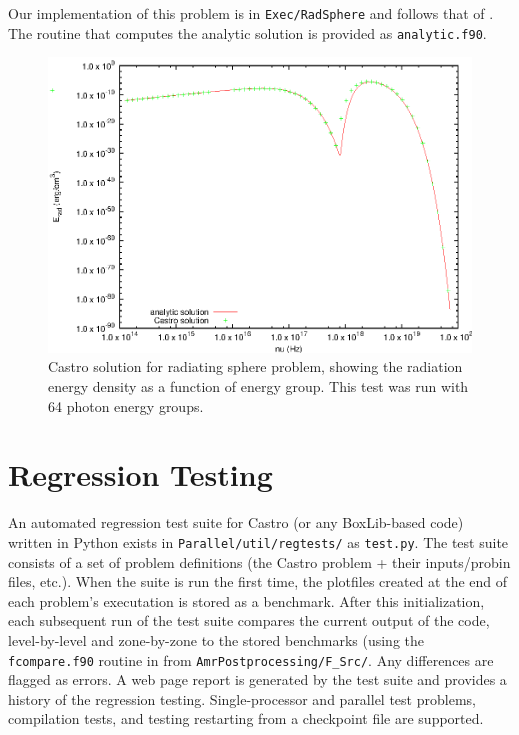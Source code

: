 Our implementation of this problem is in {\tt Exec/RadSphere} and
follows that of \cite{swestymyra:2009}.  The routine that computes
the analytic solution is provided as {\tt analytic.f90}.

\begin{figure}[h]
\centering
\includegraphics[width=5.0in]{CastroVerification/radiating_sphere}
\caption{\label{fig:radsphere} Castro solution for radiating sphere problem,
  showing the radiation energy density as a function of energy group.
  This test was run with 64 photon energy groups.}
\end{figure}


\section{Regression Testing}

An automated regression test suite for Castro (or any BoxLib-based
code) written in Python exists in {\tt Parallel/util/regtests/} as
{\tt test.py}.  The test suite consists of a set of problem
definitions (the Castro problem + their inputs/probin files, etc.).
When the suite is run the first time, the plotfiles created at the end
of each problem's executation is stored as a benchmark.  After this
initialization, each subsequent run of the test suite compares the
current output of the code, level-by-level and zone-by-zone to the
stored benchmarks (using the {\tt fcompare.f90} routine in 
from {\tt AmrPostprocessing/F_Src/}. Any differences are flagged as 
errors.  A web page report is generated by the test suite and provides
a history of the regression testing.  Single-processor and parallel
test problems, compilation tests, and testing restarting from a
checkpoint file are supported.

